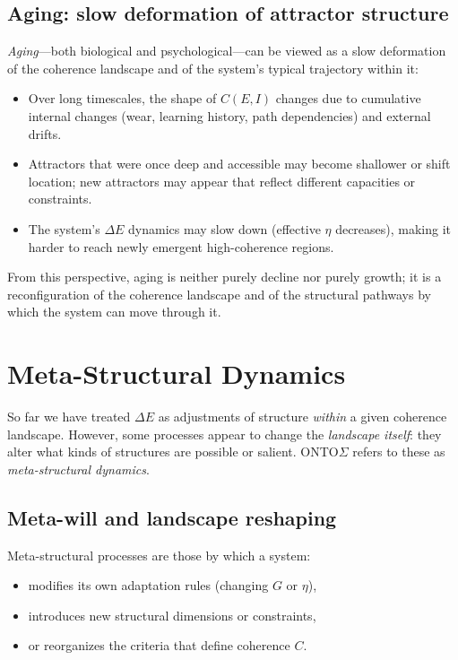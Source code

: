 \documentclass[12pt,a4paper]{report}
\begin{document}
\subsection*{Aging: slow deformation of attractor structure}

\emph{Aging}---both biological and psychological---can be viewed as a slow deformation of the coherence landscape and of the system's typical trajectory within it:

\begin{itemize}[leftmargin=2em]
    \item Over long timescales, the shape of \(C(E, I)\) changes due to cumulative internal changes (wear, learning history, path dependencies) and external drifts.
    \item Attractors that were once deep and accessible may become shallower or shift location; new attractors may appear that reflect different capacities or constraints.
    \item The system's $\Delta E$ dynamics may slow down (effective \(\eta\) decreases), making it harder to reach newly emergent high-coherence regions.
\end{itemize}

From this perspective, aging is neither purely decline nor purely growth; it is a reconfiguration of the coherence landscape and of the structural pathways by which the system can move through it.

\section{Meta-Structural Dynamics}

So far we have treated $\Delta E$ as adjustments of structure \emph{within} a given coherence landscape. However, some processes appear to change the \emph{landscape itself}: they alter what kinds of structures are possible or salient. ONTO$\Sigma$ refers to these as \emph{meta-structural dynamics}.

\subsection*{Meta-will and landscape reshaping}

Meta-structural processes are those by which a system:

\begin{itemize}[leftmargin=2em]
    \item modifies its own adaptation rules (changing \(G\) or \(\eta\)),
    \item introduces new structural dimensions or constraints,
    \item or reorganizes the criteria that define coherence \(C\).
\end{itemize}
\end{document}
